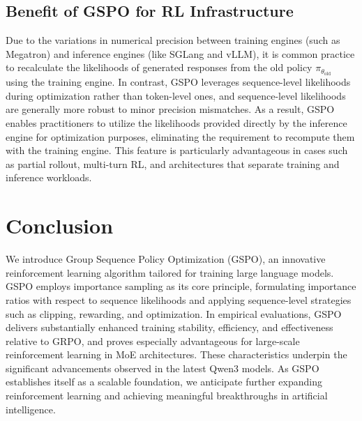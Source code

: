 \subsection{Benefit of GSPO for RL Infrastructure}

Due to the variations in numerical precision between training engines (such as Megatron) and inference engines (like SGLang and vLLM), it is common practice to recalculate the likelihoods of generated responses from the old policy $\pi_{\theta_\text{old}}$ using the training engine. In contrast, GSPO leverages sequence-level likelihoods during optimization rather than token-level ones, and sequence-level likelihoods are generally more robust to minor precision mismatches. As a result, GSPO enables practitioners to utilize the likelihoods provided directly by the inference engine for optimization purposes, eliminating the requirement to recompute them with the training engine. This feature is particularly advantageous in cases such as partial rollout, multi-turn RL, and architectures that separate training and inference workloads.

\section{Conclusion}

We introduce Group Sequence Policy Optimization (GSPO), an innovative reinforcement learning algorithm tailored for training large language models. GSPO employs importance sampling as its core principle, formulating importance ratios with respect to sequence likelihoods and applying sequence-level strategies such as clipping, rewarding, and optimization. In empirical evaluations, GSPO delivers substantially enhanced training stability, efficiency, and effectiveness relative to GRPO, and proves especially advantageous for large-scale reinforcement learning in MoE architectures. These characteristics underpin the significant advancements observed in the latest Qwen3 models. As GSPO establishes itself as a scalable foundation, we anticipate further expanding reinforcement learning and achieving meaningful breakthroughs in artificial intelligence.

